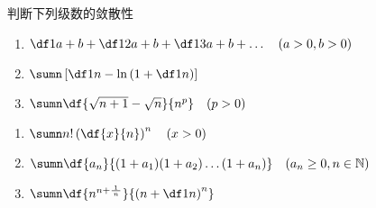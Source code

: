 \begin{frame}[<+->]{判断下列级数的敛散性}
	\linespread{2.5}
	\begin{enumerate}
	  \item $\df 1{a+b}+\df 1{2a+b}+\df 1{3a+b}+\ldots\quad (a>0,b>0)$
	  \item $\sumn\left[\df 1n-\ln\left(1+\df 1n\right)\right]$
	  \item $\sumn\df{\sqrt{n+1}-\sqrt{n}}{n^p}\quad(p>0)$
	\end{enumerate}
\end{frame}

\begin{frame}[<+->]
	\linespread{2.5}
	\begin{enumerate}
	  \addtocounter{enumi}{4}
	  \item $\sumn n!\left(\df{x}{n}\right)^n\quad (x>0)$
	  \item $\sumn\df {a_n}{(1+a_1)(1+a_2)\ldots(1+a_n)}\quad(a_n\geq
	  0,n\in\mathbb{N})$
	  \item $\sumn\df{n^{n+\frac 1{\,n\,}}}{\left(n+\df 1n\right)^n}$
	\end{enumerate}
\end{frame}

